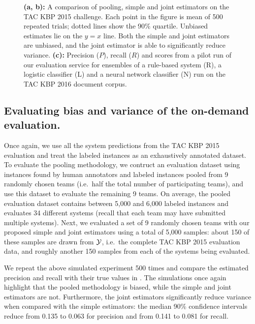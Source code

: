 \begin{figure}[t]
  \caption{\label{fig:simulation}
  \textbf{(a, b):}
  A comparison of pooling, simple and joint estimators on the TAC KBP 2015 challenge.
  Each point in the figure is mean of 500 repeated trials; dotted lines show the 90\% quartile.
  Unbiased estimates lie on the $y = x$ line.
  Both the simple and joint estimators are unbiased, and the joint estimator is able to significantly reduce variance.
  \textbf{(c):} 
Precision ($P$), recall ($R$) and \fone{} scores from a pilot run of our evaluation service for ensembles of a rule-based system (R), a logistic classifier (L) and a neural network classifier (N) run on the TAC KBP 2016 document corpus. 
  }


\end{figure}

\subsection{Evaluating bias and variance of the on-demand evaluation.}
Once again, we use all the system predictions from the TAC KBP 2015 evaluation and treat the labeled instances as an exhaustively annotated dataset.
To evaluate the pooling methodology, we contruct an evaluation dataset using
instances found by human annotators and labeled instances pooled from 9
randomly chosen teams (i.e.\ half the total number of participating teams), and
use this dataset to evaluate the remaining 9 teams.
On average, the pooled evaluation dataset contains between 5,000 and 6,000 labeled instances and evaluates 34 different systems (recall that each team may have submitted multiple systems).
Next, we evaluated a set of 9 randomly chosen teams with our proposed simple and joint estimators using a total of 5,000 samples:
about 150 of these samples are drawn from $\mathcal{Y}$, i.e.\ the complete TAC KBP 2015 evaluation data, and roughly another 150 samples from each of the systems being evaluated.

We repeat the above simulated experiment 500 times and compare the estimated precision and recall with their true values in .
The simulations once again highlight that the pooled methodology is biased, while the simple and joint estimators are not.
Furthermore, the joint estimators significantly reduce variance when compared with the simple estimators:
the median 90\% confidence intervals reduce from 0.135 to 0.063 for precision and from 0.141 to 0.081 for recall.

